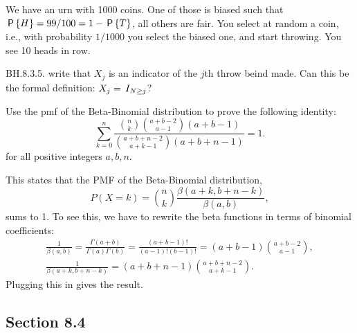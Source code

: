 \begin{exercise}
We have an urn with 1000 coins. One of those is biased such that $\P{H} = 99/100 = 1-\P{T}$, all others are fair. You select at random a coin, i.e., with probability $1/1000$ you select the biased one, and start throwing. You see 10 heads in row.
\begin{hint}
\end{hint}
\begin{solution}
\end{solution}
\end{exercise}


\begin{exercise}
BH.8.3.5. write that $X_j$ is an indicator of the $j$th throw beind made. Can this be the formal definition: $X_j = \1{N\geq j}$?
\begin{hint}
\end{hint}
\begin{solution}
\end{solution}
\end{exercise}


\begin{exercise}
Use the pmf of the Beta-Binomial distribution to prove the following identity:
\begin{equation*}
   \sum_{k=0}^n \frac{\binom{n}{k}\binom{a+b-2}{a-1}  (a+b-1) }{\binom{a+b+n-2}{a+k-1}(a+b+n-1)} = 1.
\end{equation*}
for all positive integers $a, b, n$.
\begin{solution}
This  states that the PMF of the Beta-Binomial distribution, $$P(X=k) = \binom{n}{k} \frac{\beta(a+k,b+n-k)}{\beta(a,b)},$$ sums to 1. To see this, we have to rewrite the beta functions in terms of binomial coefficients:
\begin{align*}
   \frac{1}{\beta(a,b)} = \frac{\Gamma(a+b)}{\Gamma(a)\Gamma(b)} = \frac{(a+b-1)!}{(a-1)! (b-1)!} = (a+b-1) \binom{a+b-2}{a-1}, \\
   \frac{1}{\beta(a+k,b+n-k)}  = (a+b+n-1) \binom{a+b+n-2}{a+k-1}.
\end{align*}
Plugging this in gives the result.
\end{solution}
\end{exercise}



\subsection*{Section 8.4}
\label{sec:section-8.4}

